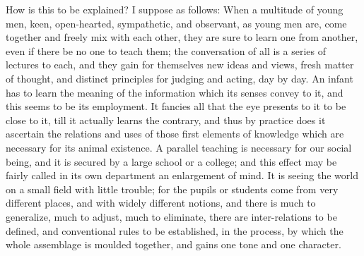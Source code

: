 How is this to be explained? I suppose as follows: When a multitude
of young men, keen, open-hearted, sympathetic, and observant, as young
men are, come together and freely mix with each other, they are sure
to learn one from another, even if there be no one to teach them; the
conversation of all is a series of lectures to each, and they gain for
themselves new ideas and views, fresh matter of thought, and distinct
principles for judging and acting, day by day. An infant has to learn
the meaning of the information which its senses convey to it, and this
seems to be its employment. It fancies all that the eye presents to it
to be close to it, till it actually learns the contrary, and thus by
practice does it ascertain the relations and uses of those first
elements of knowledge which are necessary for its animal existence. A
parallel teaching is necessary for our social being, and it is secured
by a large school or a college; and this effect may be fairly called
in its own department an enlargement of mind. It is seeing the world
on a small field with little trouble; for the pupils or students come
from very different places, and with widely different notions,
and there is much to generalize, much to adjust, much to eliminate,
there are inter-relations to be defined, and conventional rules to be
established, in the process, by which the whole assemblage is moulded
together, and gains one tone and one character.

